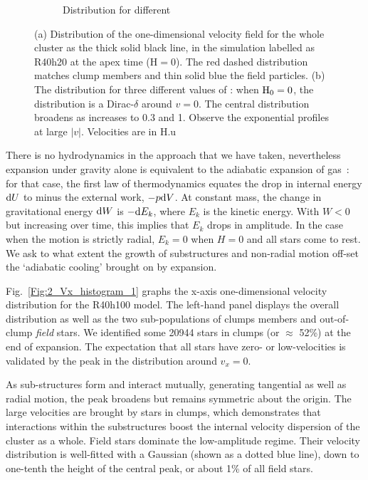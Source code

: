 \begin{figure}
\begin{subfigure}[b]{0.49\textwidth}
        \caption{Distribution for different \tHub}
        \label{Fig:2_Vx_histogram_2}
    \end{subfigure}
\caption{(a) Distribution of the one-dimensional velocity field for the whole cluster as the thick solid black line, in the simulation labelled as R40h20 at the apex time (H$ = 0$). The red dashed distribution matches clump members and thin solid blue the field particles. (b) The distribution for three different values of \tHub: when ${\textrm{H}}_0 = 0$, the distribution is a Dirac-$\delta$ around $v = 0$. The central distribution broadens as \tHub increases to 0.3 and 1. Observe the exponential profiles at large $|v|$. Velocities are in H.u} 
\label{Fig:2_Vx_histogram}
\end{figure}




 There is no hydrodynamics in the approach that we have taken, nevertheless expansion under gravity alone is equivalent to the adiabatic expansion of gas~: for that case, the first law of thermodynamics equates the drop in internal energy ${\rm d}U$ to minus the external work,  $-p {\rm d}V$. At constant mass, the change in gravitational energy ${\rm d}W$ is $ - {\rm d}E_k$, where $E_k$ is the kinetic energy. With $W < 0 $ but increasing over time, this implies that $E_k$ drops in amplitude. In the case when the motion is strictly radial, $E_k = 0$ when $H = 0$ and all stars come to rest. We ask to what extent the growth of substructures and non-radial motion  off-set the `adiabatic cooling' brought on by expansion. 

Fig.~\ref{Fig:2_Vx_histogram_1} graphs the x-axis one-dimensional velocity distribution for the R40h100 model. The left-hand panel displays the overall distribution as well as the two sub-populations of clumps members and out-of-clump \textit{field} stars. We identified some 20944 stars in clumps (or $\approx $ 52\%) at the end of expansion. The expectation that all stars have zero- or low-velocities is validated by the peak in the distribution around $v_x = 0$.

As sub-structures form and  interact mutually, generating tangential as well as radial motion, the peak broadens but remains symmetric about the origin.  The large velocities are brought by stars in clumps, which demonstrates that interactions within the substructures boost the internal velocity dispersion of the cluster as a whole. Field stars dominate the low-amplitude regime. Their velocity distribution is well-fitted with a  Gaussian (shown as a dotted blue line), down to one-tenth the height of the central peak, or about 1\% of all field stars. 

